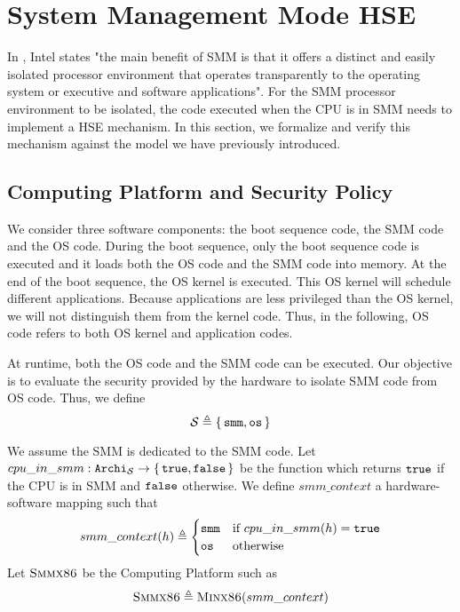 \section{System Management Mode HSE} \label{sec:speccert:smm}

In \cite{intel2014manual}, Intel states "the main benefit of SMM is that it
offers a distinct and easily isolated processor environment that operates
transparently to the operating system or executive and software
applications". For the SMM processor environment to be isolated, the code
executed when the CPU is in SMM needs to implement a HSE mechanism. In this
section, we formalize and verify this mechanism against the model we have
previously introduced.

\subsection{Computing Platform and Security Policy}

We consider three software components: the boot sequence code, the SMM code and
the OS code. During the boot sequence, only the boot sequence code is executed
and it loads both the OS code and the SMM code into memory. At the end of the
boot sequence, the OS kernel is executed. This OS kernel will schedule different
applications. Because applications are less privileged than the OS kernel, we
will not distinguish them from the kernel code. Thus, in the following, OS code
refers to both OS kernel and application codes.

At runtime, both the OS code and the SMM code can be executed. Our objective is
to evaluate the security provided by the hardware to isolate SMM code from OS
code. Thus, we define \[ \mathcal{S} \triangleq \{\,\mathtt{smm}, \mathtt{os}\,\} \]

We assume the SMM is dedicated to the SMM code.  Let $cpu\_in\_smm :
\texttt{Archi}_{\mathcal{S}} \rightarrow \{\,\mathtt{true}, \mathtt{false}\,\}$ be
the function which returns $\mathtt{true}$ if the CPU is in SMM and $\mathtt{false}$
otherwise.  We define $smm\_context$ a hardware-software mapping such that
\[ smm\_context(h) \triangleq \begin{cases}
  \mathtt{smm} & \text{if } cpu\_in\_smm(h) = \mathtt{true} \\
  \mathtt{os} & \text{otherwise}
\end{cases} \]
Let $\textsc{Smmx86}$ be the Computing Platform such as \[ \textsc{Smmx86}
\triangleq \textsc{Minx86}(smm\_context) \]

